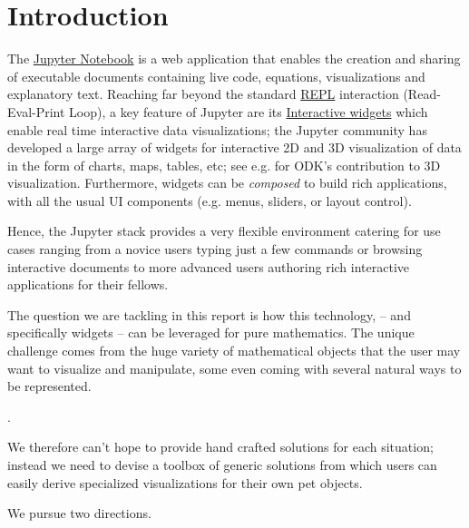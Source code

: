 \documentclass{deliverablereport}
\author{Odile Benassy and Nicolas M. Thiéry}
\begin{document}
\maketitle
\githubissuedescription

\section{Introduction}

The \href{https://jupyter.org}{Jupyter Notebook} is a web application
that enables the creation and sharing of executable documents
containing live code, equations, visualizations and explanatory text.
Reaching far beyond the standard
\href{https://en.wikipedia.org/wiki/Read-eval-print_loop}{REPL}
interaction (Read-Eval-Print Loop), a key feature of Jupyter are its
\href{http://jupyter.org/widgets}{Interactive widgets} which enable
real time interactive data visualizations; the Jupyter community has
developed a large array of widgets for interactive 2D and 3D
visualization of data in the form of charts, maps, tables, etc; see
e.g.  for ODK's contribution to 3D visualization.
Furthermore, widgets can be \emph{composed} to build rich
applications, with all the usual UI components (e.g. menus, sliders,
or layout control).

Hence, the Jupyter stack provides a very flexible environment catering
for use cases ranging from a novice users typing just a few commands
or browsing interactive documents to more advanced users authoring
rich interactive applications for their fellows.

The question we are tackling in this report is how this technology, --
and specifically widgets -- can be leveraged for pure mathematics. The
unique challenge comes from the huge variety of mathematical objects
that the user may want to visualize and manipulate, some even coming
with several natural ways to be represented.

.

We therefore can't hope to provide hand crafted solutions for each
situation; instead we need to devise a toolbox of generic solutions
from which users can easily derive specialized visualizations for
their own pet objects.

We pursue two directions.
\end{document}
